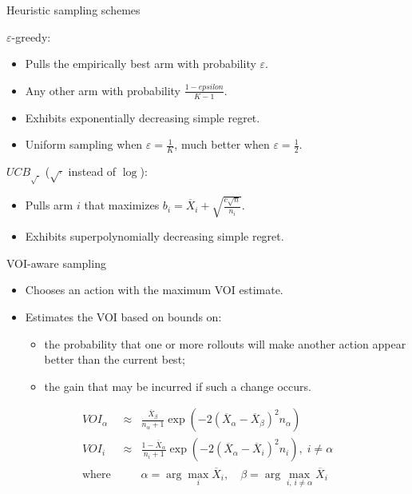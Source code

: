 \documentclass{beamer}
\begin{document}
\begin{frame}{Heuristic sampling schemes}

\onslide<+->
$\varepsilon$-greedy:
\begin{itemize} 
\item Pulls the empirically best arm with probability $\varepsilon$.
\item Any other arm with probability $\frac {1-epsilon} {K-1}$.
\item Exhibits exponentially decreasing simple regret.
\item Uniform sampling when $\varepsilon=\frac 1 K$, much better when
  $\varepsilon=\frac 1 2$.
\end{itemize}
\vspace{1em}
\onslide<+->
$UCB_{\sqrt{\cdot}}$ ($\sqrt{\cdot}$ instead of $\log$): 
\begin{itemize}
\item Pulls arm $i$ that maximizes
  $b_i=\overline X_i+\sqrt {\frac {c \sqrt n} {n_i}}$. 
\item Exhibits superpolynomially decreasing simple regret.
\end{itemize}
\end{frame}

\begin{frame}{VOI-aware sampling}

\begin{itemize}
\item Chooses an action with the maximum VOI estimate.
\item Estimates the VOI based on bounds on:
  \begin{itemize}
  \item the probability that one or more rollouts will make another
    action appear better than the current best;
  \item the gain that may be incurred if such a change occurs.
  \end{itemize}
\end{itemize}
\begin{eqnarray*}
VOI_\alpha&\approx&\frac {\overline X_\beta} {n_\alpha+1}
\exp\left(-2(\overline X_\alpha - \overline X_\beta)^2 n_\alpha\right)\\
VOI_i&\approx&\frac {1-\overline X_\alpha} {n_i+1}
\exp\left(-2(\overline X_\alpha - \overline X_i)^2 n_i\right),\; i\ne\alpha\nonumber\\
\mbox{where }&&\alpha=\arg\max_i \overline X_i,\quad
             \beta=\arg\max_{i,\,i\ne\alpha} \overline X_i\nonumber
\end{eqnarray*}
\end{frame}
\end{document}
